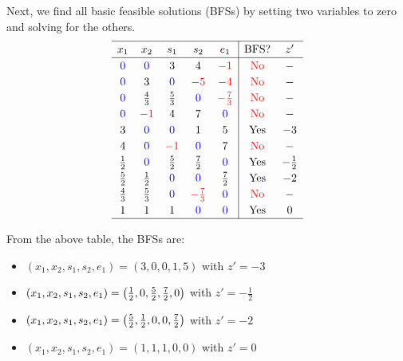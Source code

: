 \documentclass[a4paper, 10pt]{article}
\begin{document}
\begin{solution}
\par\hspace{5mm} Next, we find all basic feasible solutions (BFSs) by setting two variables to zero and solving for the others.
\[
\renewcommand{\arraystretch}{1.2}
\begin{array}{ccccc|cc}
    \hline
    x_1 & x_2 & s_1 & s_2 & e_1 & \text{BFS}? & z' \\
    \hline
    \textcolor[HTML]{0000FF}{0} & \textcolor[HTML]{0000FF}{0} & 3 & 4 & \textcolor[HTML]{FF0000}{-1} & \textcolor[HTML]{FF0000}{\text{No}} & - \\
    \textcolor[HTML]{0000FF}{0} & 3 & \textcolor[HTML]{0000FF}{0} & \textcolor[HTML]{FF0000}{-5} & \textcolor[HTML]{FF0000}{-4} & \textcolor[HTML]{FF0000}{\text{No}} & - \\
    \textcolor[HTML]{0000FF}{0} & \frac{4}{3} & \frac{5}{3} & \textcolor[HTML]{0000FF}{0} & \textcolor[HTML]{FF0000}{-\frac{7}{3}} & \textcolor[HTML]{FF0000}{\text{No}} & - \\
    \textcolor[HTML]{0000FF}{0} & \textcolor[HTML]{FF0000}{-1} & 4 & 7 & \textcolor[HTML]{0000FF}{0} & \textcolor[HTML]{FF0000}{\text{No}} & - \\
    3 & \textcolor[HTML]{0000FF}{0} & \textcolor[HTML]{0000FF}{0} & 1 & 5 & \text{Yes} & -3 \\
    4 & \textcolor[HTML]{0000FF}{0} & \textcolor[HTML]{FF0000}{-1} & \textcolor[HTML]{0000FF}{0} & 7 & \textcolor[HTML]{FF0000}{\text{No}} & - \\
    \frac{1}{2} & \textcolor[HTML]{0000FF}{0} & \frac{5}{2} & \frac{7}{2} & \textcolor[HTML]{0000FF}{0} & \text{Yes} & -\frac{1}{2} \\
    \frac{5}{2} & \frac{1}{2} & \textcolor[HTML]{0000FF}{0} & \textcolor[HTML]{0000FF}{0} & \frac{7}{2} & \text{Yes} & -2 \\
    \frac{4}{3} & \frac{5}{3} & \textcolor[HTML]{0000FF}{0} & \textcolor[HTML]{FF0000}{-\frac{7}{3}} & \textcolor[HTML]{0000FF}{0} & \textcolor[HTML]{FF0000}{\text{No}} & - \\
    1 & 1 & 1 & \textcolor[HTML]{0000FF}{0} & \textcolor[HTML]{0000FF}{0} & \text{Yes} & 0 \\
    \hline
\end{array}
\]

From the above table, the BFSs are:
\begin{itemize}
    \item \( (x_1, x_2, s_1, s_2, e_1) = (3, 0, 0, 1, 5) \) with \( z' = -3 \)
    \item \( (x_1, x_2, s_1, s_2, e_1) = \left( \frac{1}{2}, 0, \frac{5}{2}, \frac{7}{2}, 0 \right) \) with \( z' = -\frac{1}{2} \)
    \item \( (x_1, x_2, s_1, s_2, e_1) = \left( \frac{5}{2}, \frac{1}{2}, 0, 0, \frac{7}{2} \right) \) with \( z' = -2 \)
    \item \( (x_1, x_2, s_1, s_2, e_1) = (1, 1, 1, 0, 0) \) with \( z' = 0 \)
\end{itemize}


\end{solution}
\end{document}
